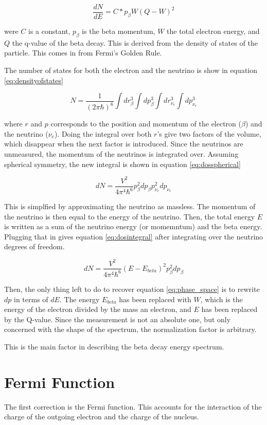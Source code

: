 \begin{equation}
	\frac{dN}{dE} = C * p_{\beta}W(Q - W)^{2}
	\label{eq:phase_space}
\end{equation}

were $C$ is a constant, $p_{\beta}$ is the beta momentum, $W$ the total electron energy, and $Q$ the q-value of the beta decay.
This is derived from the density of states of the particle.
This comes in from Fermi's Golden Rule.

The number of states for both the electron and the neutrino is show in equation \ref{eq:densityofstates}

\begin{equation}
	N = \frac{1}{(2\pi\hbar)^{6}}\int dr^{3}_{\beta} \int dp^{3}_{\beta}\int dr^{3}_{\nu_{e}} \int dp^{3}_{\nu_{e}} 
	\label{eq:densityofstates}
\end{equation}

where $r$ and $p$ corresponds to the position and momentum of the electron ($\beta$) and the neutrino ($\nu_{e}$).
Doing the integral over both $r$'s give two factors of the volume, which disappear when the next factor is introduced.
Since the neutrinos are unmeasured, the momentum of the neutrinos is integrated over. 
Assuming spherical symmetry, the new integral is shown in equation \ref{eq:dosspherical}

\begin{equation}
	dN = \frac{V^{2}}{4\pi^{4}\hbar^{6}}p_{\beta}^{2}dp_{\beta}p_{\nu_{e}}^{2}dp_{\nu_{e}}
	\label{eq:dosspherical}
\end{equation}

This is simplfied by approximating the neutrino as massless.
The momentum of the neutrino is then equal to the energy of the neutrino.
Then, the total energy $E$ is written as a sum of the neutrino energy (or momemntum) and the beta energy.
Plugging that in gives equation \ref{eq:dosintegral} after integrating over the neutrino degrees of freedom. 

\begin{equation}
	dN = \frac{V^{2}}{4\pi^{4}\hbar^{6}}(E - E_{beta})^{2}p_{\beta}^{2}dp_{\beta}
	\label{eq:dosintegral}
\end{equation}

Then, the only thing left to do to recover equation \ref{eq:phase_space} is to rewrite $dp$ in terms of $dE$. 
The energy $E_{beta}$ has been replaced with $W$, which is the energy of the electron divided by the mass an electron, and $E$ has been replaced by the Q-value.
Since the measurement is not an absolute one, but only concerned with the shape of the spectrum, the normalization factor is arbitrary.

This is the main factor in describing the beta decay energy spectrum.


\section{Fermi Function}

The first correction is the Fermi function.
This accounts for the interaction of the charge of the outgoing electron and the charge of the nucleus.
 
